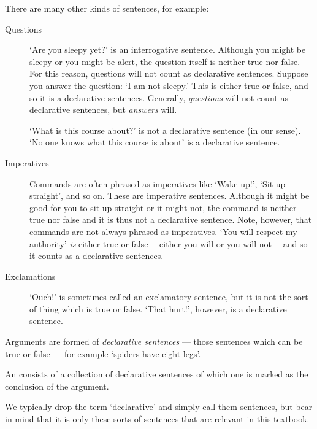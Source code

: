 There are many other kinds of sentences, for example:
\begin{description}
\item[{Questions}] `Are you sleepy yet?' is an interrogative sentence. Although you might be sleepy or you might be alert, the question itself is neither true nor false. For this reason, questions will not count as declarative sentences. Suppose you answer the question: `I am not sleepy.' This is either true or false, and so it is a declarative sentences. Generally, \emph{questions} will not count as declarative sentences, but \emph{answers} will.

`What is this course about?' is not a declarative sentence (in our sense). `No one knows what this course is about' is a declarative sentence.

\item[{Imperatives}] Commands are often phrased as imperatives like `Wake up!', `Sit up straight', and so on. These are imperative sentences. Although it might be good for you to sit up straight or it might not, the command is neither true nor false and it is thus not a declarative sentence. Note, however, that commands are not always phrased as imperatives. `You will respect my authority' \emph{is} either true or false--- either you will or you will not--- and so it counts as a declarative sentences.

\item[{Exclamations}] `Ouch!' is sometimes called an exclamatory sentence, but it is not the sort of thing which is true or false. `That hurt!', however, is a declarative sentence.

\end{description}

Arguments are formed of \emph{declarative sentences} --- those sentences which can be true or false --- for example `spiders have eight legs'. 

\begin{highlighted}An  consists of a collection of declarative sentences of which one is marked as the conclusion of the argument.\end{highlighted}


We typically drop the term `declarative' and simply call them sentences, but bear in mind that it is only these sorts of sentences that are relevant in this textbook.

